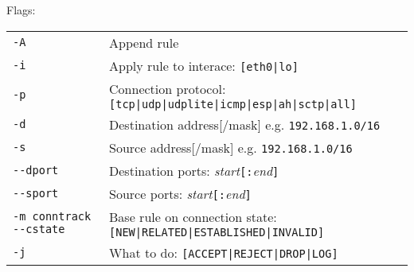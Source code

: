 Flags:\\
\begin{tabular}{@{}p{\the\MyLen}%
				@{}p{\linewidth-\the\MyLen}}
	\verb!-A!						& Append rule \\
	\verb!-i!						& Apply rule to interace: \verb![eth0|lo]!\\
	\verb!-p!						& Connection protocol: \verb![tcp|udp|udplite|icmp|esp|ah|sctp|all]!\\
	\verb!-d!						& Destination address[/mask] e.g. \verb!192.168.1.0/16!\\
	\verb!-s!						& Source address[/mask] e.g. \verb!192.168.1.0/16!\\
	\verb!--dport!					& Destination ports: \textit{start}\verb![:!\textit{end}\verb!]!\\
	\verb!--sport!					& Source ports: \textit{start}\verb![:!\textit{end}\verb!]!\\
	\verb!-m conntrack --cstate!	& Base rule on connection state: \verb![NEW|RELATED|ESTABLISHED|INVALID]!\\
	\verb!-j!						& What to do: \verb![ACCEPT|REJECT|DROP|LOG]!\\
\end{tabular}

